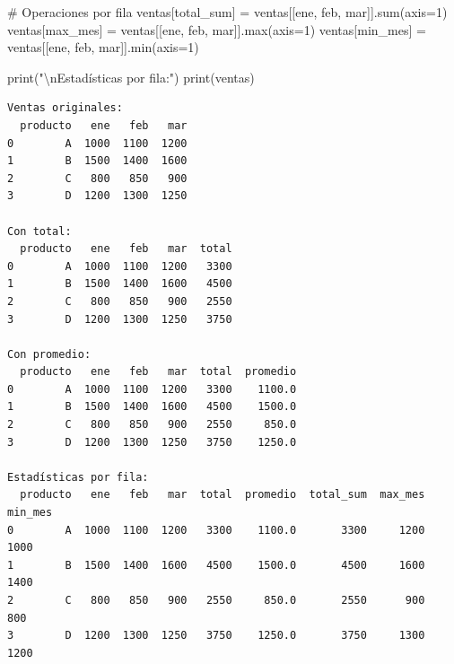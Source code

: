 \documentclass[
  doc,
  floatsintext,
  longtable,
  a4paper,
  nolmodern,
  notxfonts,
  notimes,
  12pt,
  colorlinks=true,linkcolor=blue,citecolor=blue,urlcolor=blue]{apa7}
\newenvironment{Shaded}{\begin{snugshade}}{\end{snugshade}}
\newcommand{\BuiltInTok}[1]{\textcolor[rgb]{0.00,0.23,0.31}{#1}}
\newcommand{\CharTok}[1]{\textcolor[rgb]{0.13,0.47,0.30}{#1}}
\newcommand{\CommentTok}[1]{\textcolor[rgb]{0.37,0.37,0.37}{#1}}
\newcommand{\DecValTok}[1]{\textcolor[rgb]{0.68,0.00,0.00}{#1}}
\newcommand{\NormalTok}[1]{\textcolor[rgb]{0.00,0.23,0.31}{#1}}
\newcommand{\OperatorTok}[1]{\textcolor[rgb]{0.37,0.37,0.37}{#1}}
\newcommand{\StringTok}[1]{\textcolor[rgb]{0.13,0.47,0.30}{#1}}
\begin{document}
\begin{Shaded}
\begin{Highlighting}[]
\CommentTok{\# Operaciones por fila}
\NormalTok{ventas[}\StringTok{\textquotesingle{}total\_sum\textquotesingle{}}\NormalTok{] }\OperatorTok{=}\NormalTok{ ventas[[}\StringTok{\textquotesingle{}ene\textquotesingle{}}\NormalTok{, }\StringTok{\textquotesingle{}feb\textquotesingle{}}\NormalTok{, }\StringTok{\textquotesingle{}mar\textquotesingle{}}\NormalTok{]].}\BuiltInTok{sum}\NormalTok{(axis}\OperatorTok{=}\DecValTok{1}\NormalTok{)}
\NormalTok{ventas[}\StringTok{\textquotesingle{}max\_mes\textquotesingle{}}\NormalTok{] }\OperatorTok{=}\NormalTok{ ventas[[}\StringTok{\textquotesingle{}ene\textquotesingle{}}\NormalTok{, }\StringTok{\textquotesingle{}feb\textquotesingle{}}\NormalTok{, }\StringTok{\textquotesingle{}mar\textquotesingle{}}\NormalTok{]].}\BuiltInTok{max}\NormalTok{(axis}\OperatorTok{=}\DecValTok{1}\NormalTok{)}
\NormalTok{ventas[}\StringTok{\textquotesingle{}min\_mes\textquotesingle{}}\NormalTok{] }\OperatorTok{=}\NormalTok{ ventas[[}\StringTok{\textquotesingle{}ene\textquotesingle{}}\NormalTok{, }\StringTok{\textquotesingle{}feb\textquotesingle{}}\NormalTok{, }\StringTok{\textquotesingle{}mar\textquotesingle{}}\NormalTok{]].}\BuiltInTok{min}\NormalTok{(axis}\OperatorTok{=}\DecValTok{1}\NormalTok{)}

\BuiltInTok{print}\NormalTok{(}\StringTok{"}\CharTok{\textbackslash{}n}\StringTok{Estadísticas por fila:"}\NormalTok{)}
\BuiltInTok{print}\NormalTok{(ventas)}
\end{Highlighting}
\end{Shaded}

\begin{verbatim}
Ventas originales:
  producto   ene   feb   mar
0        A  1000  1100  1200
1        B  1500  1400  1600
2        C   800   850   900
3        D  1200  1300  1250

Con total:
  producto   ene   feb   mar  total
0        A  1000  1100  1200   3300
1        B  1500  1400  1600   4500
2        C   800   850   900   2550
3        D  1200  1300  1250   3750

Con promedio:
  producto   ene   feb   mar  total  promedio
0        A  1000  1100  1200   3300    1100.0
1        B  1500  1400  1600   4500    1500.0
2        C   800   850   900   2550     850.0
3        D  1200  1300  1250   3750    1250.0

Estadísticas por fila:
  producto   ene   feb   mar  total  promedio  total_sum  max_mes  min_mes
0        A  1000  1100  1200   3300    1100.0       3300     1200     1000
1        B  1500  1400  1600   4500    1500.0       4500     1600     1400
2        C   800   850   900   2550     850.0       2550      900      800
3        D  1200  1300  1250   3750    1250.0       3750     1300     1200
\end{verbatim}
\end{document}
